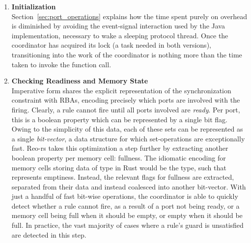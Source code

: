 \begin{enumerate}
	\item \textbf{Initialization}\\
	Section~\ref{sec:port_operations} explains how the time spent purely on overhead is diminished by avoiding the event-signal interaction used by the Java implementation, necessary to wake a sleeping protocol thread. Once the coordinator has acquired its lock (a task needed in both versions), transitioning into the work of the coordinator is nothing more than the time taken to invoke the  function call.
	
	\item \textbf{Checking Readiness and Memory State}\\
	Imperative form shares the explicit representation of the synchronization constraint with RBAs, encoding precisely which ports are involved with the firing. Clearly, a rule cannot fire until all ports involved are \textit{ready}. Per port, this is a boolean property which can be represented by a single bit flag. Owing to the simplicity of this data, each of these sets can be represented as a single \textit{bit-vector}, a data structure for which set-operations are exceptionally fast. Reo-rs takes this optimization a step further by extracting another boolean property per memory cell: fullness. The idiomatic encoding for memory cells storing data of type  in Rust would be the  type, such that  represents emptiness. Instead, the relevant flags for fullness are extracted, separated from their data and instead coalesced into another bit-vector. With just a handful of fast bit-wise operations, the coordinator is able to quickly detect whether a rule cannot fire, as a result of a port not being ready, or a memory cell being full when it should be empty, or empty when it should be full. In practice, the vast majority of cases where a rule's guard is unsatisfied are detected in this step.
	

\end{enumerate}

